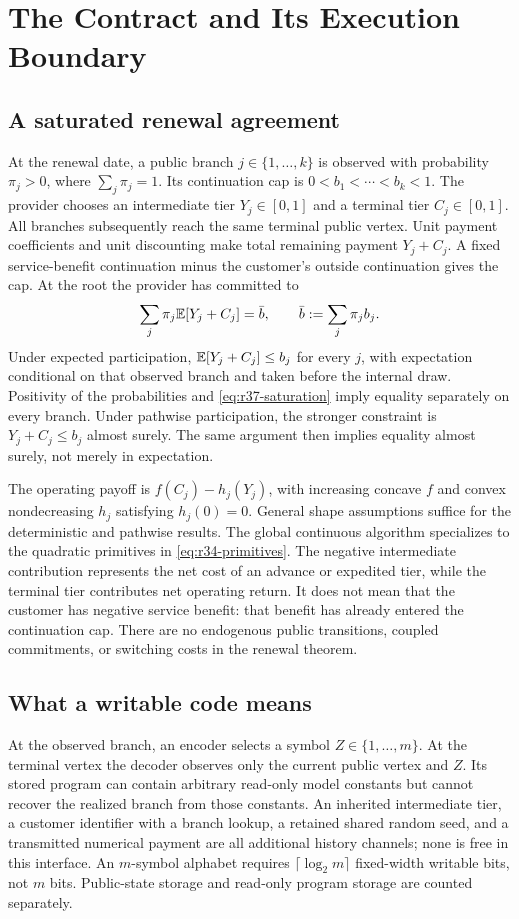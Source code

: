 \section{The Contract and Its Execution Boundary}\label{sec:r37-institution}
\subsection{A saturated renewal agreement}
At the renewal date, a public branch $j\in\{1,\ldots,k\}$ is observed with probability $\pi_j>0$, where $\sum_j\pi_j=1$. Its continuation cap is $0<b_1<\cdots<b_k<1$. The provider chooses an intermediate tier $Y_j\in[0,1]$ and a terminal tier $C_j\in[0,1]$. All branches subsequently reach the same terminal public vertex. Unit payment coefficients and unit discounting make total remaining payment $Y_j+C_j$. A fixed service-benefit continuation minus the customer's outside continuation gives the cap. At the root the provider has committed to
\begin{equation}\label{eq:r37-saturation}
 \sum_j\pi_j\mathbb E[Y_j+C_j]=\bar b,
 \qquad \bar b:=\sum_j\pi_jb_j.
\end{equation}
Under expected participation, $\mathbb E[Y_j+C_j]\leq b_j$ for every $j$, with expectation conditional on that observed branch and taken before the internal draw. Positivity of the probabilities and \eqref{eq:r37-saturation} imply equality separately on every branch. Under pathwise participation, the stronger constraint is $Y_j+C_j\leq b_j$ almost surely. The same argument then implies equality almost surely, not merely in expectation.

The operating payoff is $f(C_j)-h_j(Y_j)$, with increasing concave $f$ and convex nondecreasing $h_j$ satisfying $h_j(0)=0$. General shape assumptions suffice for the deterministic and pathwise results. The global continuous algorithm specializes to the quadratic primitives in \eqref{eq:r34-primitives}. The negative intermediate contribution represents the net cost of an advance or expedited tier, while the terminal tier contributes net operating return. It does not mean that the customer has negative service benefit: that benefit has already entered the continuation cap. There are no endogenous public transitions, coupled commitments, or switching costs in the renewal theorem.

\subsection{What a writable code means}
At the observed branch, an encoder selects a symbol $Z\in\{1,\ldots,m\}$. At the terminal vertex the decoder observes only the current public vertex and $Z$. Its stored program can contain arbitrary read-only model constants but cannot recover the realized branch from those constants. An inherited intermediate tier, a customer identifier with a branch lookup, a retained shared random seed, and a transmitted numerical payment are all additional history channels; none is free in this interface. An $m$-symbol alphabet requires $\lceil\log_2m\rceil$ fixed-width writable bits, not $m$ bits. Public-state storage and read-only program storage are counted separately.

